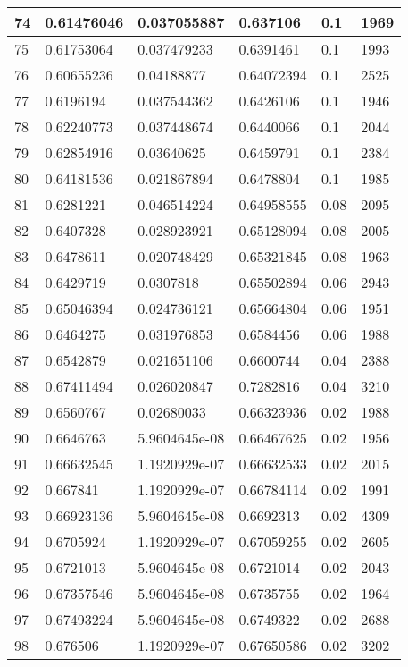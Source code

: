 \begin{longtable}{|l|l|l|l|l|l|}
74 & 0.61476046 & 0.037055887 & 0.637106 & 0.1 & 1969 \\ \hline 
75 & 0.61753064 & 0.037479233 & 0.6391461 & 0.1 & 1993 \\ \hline 
76 & 0.60655236 & 0.04188877 & 0.64072394 & 0.1 & 2525 \\ \hline 
77 & 0.6196194 & 0.037544362 & 0.6426106 & 0.1 & 1946 \\ \hline 
78 & 0.62240773 & 0.037448674 & 0.6440066 & 0.1 & 2044 \\ \hline 
79 & 0.62854916 & 0.03640625 & 0.6459791 & 0.1 & 2384 \\ \hline 
80 & 0.64181536 & 0.021867894 & 0.6478804 & 0.1 & 1985 \\ \hline 
81 & 0.6281221 & 0.046514224 & 0.64958555 & 0.08 & 2095 \\ \hline 
82 & 0.6407328 & 0.028923921 & 0.65128094 & 0.08 & 2005 \\ \hline 
83 & 0.6478611 & 0.020748429 & 0.65321845 & 0.08 & 1963 \\ \hline 
84 & 0.6429719 & 0.0307818 & 0.65502894 & 0.06 & 2943 \\ \hline 
85 & 0.65046394 & 0.024736121 & 0.65664804 & 0.06 & 1951 \\ \hline 
86 & 0.6464275 & 0.031976853 & 0.6584456 & 0.06 & 1988 \\ \hline 
87 & 0.6542879 & 0.021651106 & 0.6600744 & 0.04 & 2388 \\ \hline 
88 & 0.67411494 & 0.026020847 & 0.7282816 & 0.04 & 3210 \\ \hline 
89 & 0.6560767 & 0.02680033 & 0.66323936 & 0.02 & 1988 \\ \hline 
90 & 0.6646763 & 5.9604645e-08 & 0.66467625 & 0.02 & 1956 \\ \hline 
91 & 0.66632545 & 1.1920929e-07 & 0.66632533 & 0.02 & 2015 \\ \hline 
92 & 0.667841 & 1.1920929e-07 & 0.66784114 & 0.02 & 1991 \\ \hline 
93 & 0.66923136 & 5.9604645e-08 & 0.6692313 & 0.02 & 4309 \\ \hline 
94 & 0.6705924 & 1.1920929e-07 & 0.67059255 & 0.02 & 2605 \\ \hline 
95 & 0.6721013 & 5.9604645e-08 & 0.6721014 & 0.02 & 2043 \\ \hline 
96 & 0.67357546 & 5.9604645e-08 & 0.6735755 & 0.02 & 1964 \\ \hline 
97 & 0.67493224 & 5.9604645e-08 & 0.6749322 & 0.02 & 2688 \\ \hline 
98 & 0.676506 & 1.1920929e-07 & 0.67650586 & 0.02 & 3202 \\ \hline 

\end{longtable}
